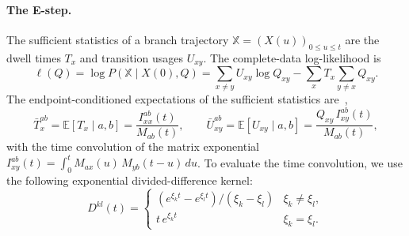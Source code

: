 \documentclass[11pt]{article}
\newcommand{\E}{\mathbb{E}}
\begin{document}
\paragraph{The E-step.} The sufficient statistics of a branch
trajectory $\mathbb X=(X(u))_{0\le u\le t}$ are the dwell times $T_x$ and
transition usages $U_{xy}$. The complete-data log-likelihood is
\begin{equation}
\label{eq:cdl}
\ell(Q)=\log P(\mathbb X\mid X(0),Q)=\sum_{x\ne y}U_{xy}\log Q_{xy}
   -\sum_x T_x\!\!\sum_{y\ne x}\!Q_{xy}.
\end{equation}
The endpoint-conditioned expectations of the sufficient statistics are~\citep{HobolthJensen2005,HobolthJensen2011,HolmesRubin2002},
\begin{equation}
\label{eq:bridge}
\bar{T}_x^{ab} = \E[T_x\mid a,b]=\frac{I^{ab}_{xx}(t)}{M_{ab}(t)},\qquad
\bar{U}_{xy}^{ab} = \E[U_{xy}\mid a,b]=\frac{Q_{xy}\,I^{ab}_{xy}(t)}{M_{ab}(t)},
\end{equation}
with the time convolution of the matrix exponential $I^{ab}_{xy}(t)=\int_0^t M_{ax}(u)\,M_{yb}(t{-}u)\,du$.
To evaluate the time convolution, we use the following exponential divided-difference kernel:
\begin{equation}
\label{eq:bridgestat}
D^{kl}(t)=
\begin{cases}(e^{\xi_k t}-e^{\xi_l t})/(\xi_k-\xi_l)&\xi_k\ne\xi_l,\\[2pt]
t\,e^{\xi_k t}&\xi_k=\xi_l.\end{cases}
\end{equation}
\end{document}
